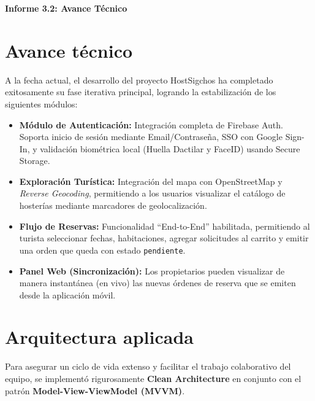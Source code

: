 \documentclass{article}
\begin{document}
\vspace{-2cm}
\begin{minipage}[t]{0.6\textwidth}
  \raggedright
  \textbf{\LARGE Informe 3.2: Avance Técnico}
\end{minipage}
\begin{minipage}[ht]{0.2\textwidth}
  \raggedleft
\end{minipage}\vspace{-1cm}

\pagestyle{fancy}
\fancyhf{}
\fancyfoot[C]{\thepage}
\renewcommand{\headrulewidth}{0.4pt}

\tableofcontents
\newpage

\section{Avance técnico}
A la fecha actual, el desarrollo del proyecto HostSigchos ha completado exitosamente su fase iterativa principal, logrando la estabilización de los siguientes módulos:
\begin{itemize}[label=\small\color{verdeO}$\blacksquare$]
    \item \textbf{Módulo de Autenticación:} Integración completa de Firebase Auth. Soporta inicio de sesión mediante Email/Contraseña, SSO con Google Sign-In, y validación biométrica local (Huella Dactilar y FaceID) usando Secure Storage.
    \item \textbf{Exploración Turística:} Integración del mapa con OpenStreetMap y \textit{Reverse Geocoding}, permitiendo a los usuarios visualizar el catálogo de hosterías mediante marcadores de geolocalización.
    \item \textbf{Flujo de Reservas:} Funcionalidad ``End-to-End'' habilitada, permitiendo al turista seleccionar fechas, habitaciones, agregar solicitudes al carrito y emitir una orden que queda con estado \texttt{pendiente}.
    \item \textbf{Panel Web (Sincronización):} Los propietarios pueden visualizar de manera instantánea (en vivo) las nuevas órdenes de reserva que se emiten desde la aplicación móvil.
\end{itemize}

\section{Arquitectura aplicada}
Para asegurar un ciclo de vida extenso y facilitar el trabajo colaborativo del equipo, se implementó rigurosamente \textbf{Clean Architecture} en conjunto con el patrón \textbf{Model-View-ViewModel (MVVM)}. 
\end{document}
